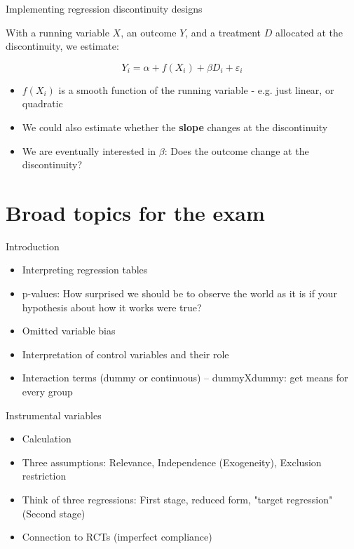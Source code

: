 \documentclass[11pt,xcolor=table]{beamer}
\begin{document}
\begin{frame}{Implementing regression discontinuity designs}

With a running variable $X$, an outcome $Y$, and a treatment $D$ allocated at the discontinuity, we estimate:

$$ Y_i = \alpha +  f(X_i) + \beta D_i + \varepsilon_i $$
    \begin{itemize}
        \item $f(X_i)$ is a smooth function of the running variable - e.g. just linear, or quadratic
        \item We could also estimate whether the \textbf{slope} changes at the discontinuity
        \item We are eventually interested in $\beta$: Does the outcome change at the discontinuity?
    \end{itemize}
\end{frame}



 \section{Broad topics for the exam}
 \begin{frame}{Introduction}
     \begin{itemize}
         \item Interpreting regression tables
         \item p-values: How surprised we should be to observe the world as it is if your hypothesis about how it works were true?
         \item Omitted variable bias
         \item Interpretation of control variables and their role
         \item Interaction terms (dummy or continuous) -- dummyXdummy: get means for every group
     \end{itemize}
 \end{frame}




  \begin{frame}{Instrumental variables}
     \begin{itemize}
         \item Calculation
         \item Three assumptions: Relevance, Independence (Exogeneity), Exclusion restriction
         \item Think of three regressions: First stage, reduced form, "target regression" (Second stage)
         \item Connection to RCTs (imperfect compliance)
     \end{itemize}
 \end{frame}
\end{document}
